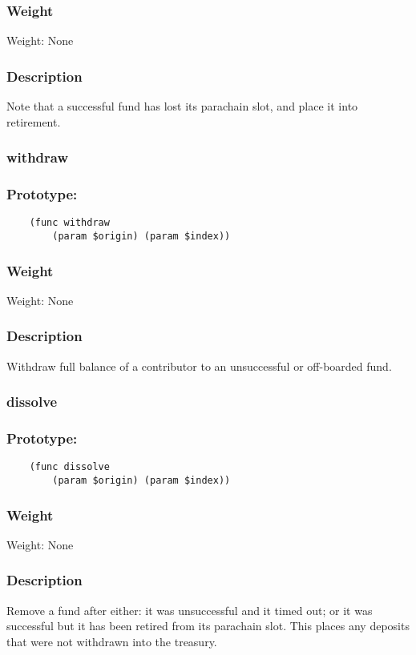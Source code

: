 \documentclass[11pt,a4paper]{article}
\begin{document}
\subsubsection*{Weight}
Weight: None
\subsubsection*{Description}
Note that a successful fund has lost its parachain slot, and place it into retirement.

\subsubsection{withdraw}
\subsubsection*{Prototype:}
\begin{verbatim}
    (func withdraw
        (param $origin) (param $index))
\end{verbatim}
\subsubsection*{Weight}
Weight: None
\subsubsection*{Description}
Withdraw full balance of a contributor to an unsuccessful or off-boarded fund.

\subsubsection{dissolve}
\subsubsection*{Prototype:}
\begin{verbatim}
    (func dissolve
        (param $origin) (param $index))
\end{verbatim}
\subsubsection*{Weight}
Weight: None
\subsubsection*{Description}
Remove a fund after either: it was unsuccessful and it timed out; or it was successful but it has been retired from its parachain slot. This places any deposits that were not withdrawn into the treasury.
\end{document}
